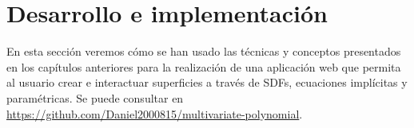\chapter{Desarrollo e implementación}\label{chapter3}
En esta sección veremos cómo se han usado las técnicas y conceptos presentados en los capítulos anteriores para la realización de una aplicación web que permita al usuario crear e interactuar superficies a través de SDFs, ecuaciones implícitas y paramétricas. Se puede consultar en \href{https://daniel2000815.github.io/SDF-Visualizer/}{https://github.com/Daniel2000815/multivariate-polynomial}.\newline

